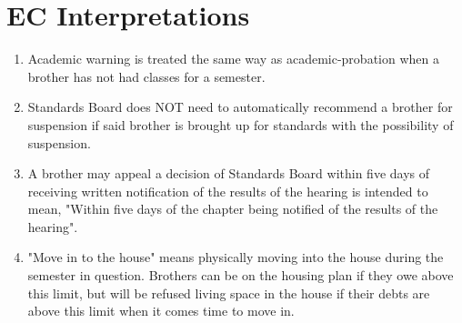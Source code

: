 \chapter{EC Interpretations}
\begin{enumerate}
	\item Academic warning is treated the same way as \gls{academic-probation} when a brother has not had classes for a semester.
	\item Standards Board does NOT need to automatically recommend a brother for suspension if said brother is brought up for standards with the possibility of suspension.
	\item A brother may appeal a decision of Standards Board within five days of receiving written notification of the results of the hearing is intended to mean, "Within five days of the chapter being notified of the results of the hearing".
	\item "Move in to the house" means physically moving into the house during the semester in question.  Brothers can be on the housing plan if they owe above this limit, but will be refused living space in the house if their debts are above this limit when it comes time to move in.
\end{enumerate}
